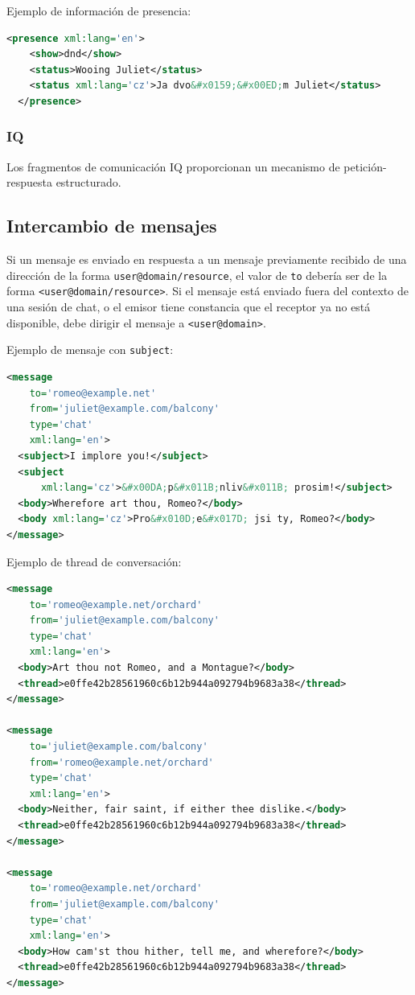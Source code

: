 \documentclass[a4paper, 11pt]{article} %
\begin{document}
      Ejemplo de información de presencia:
  \begin{lstlisting}[language=XML]
  <presence xml:lang='en'>
    <show>dnd</show>
    <status>Wooing Juliet</status>
    <status xml:lang='cz'>Ja dvo&#x0159;&#x00ED;m Juliet</status>
  </presence>
  \end{lstlisting}
  
    \subsubsection{IQ}
      Los fragmentos de comunicación IQ proporcionan un mecanismo de petición-respuesta estructurado.
 
  \subsection{Intercambio de mensajes}
    Si un mensaje es enviado en respuesta a un mensaje previamente recibido de una dirección de la forma 
    \texttt{user@domain/resource}, el valor de \texttt{to} debería ser de la forma \texttt{<user@domain/resource>}. Si el
    mensaje está enviado fuera del contexto de una sesión de chat, o el emisor tiene constancia que el receptor ya no
    está disponible, debe dirigir el mensaje a \texttt{<user@domain>}.
    
    Ejemplo de mensaje con \texttt{subject}:
    \begin{lstlisting}[language=XML]  
<message
    to='romeo@example.net'
    from='juliet@example.com/balcony'
    type='chat'
    xml:lang='en'>
  <subject>I implore you!</subject>
  <subject
      xml:lang='cz'>&#x00DA;p&#x011B;nliv&#x011B; prosim!</subject>
  <body>Wherefore art thou, Romeo?</body>
  <body xml:lang='cz'>Pro&#x010D;e&#x017D; jsi ty, Romeo?</body>
</message> 
    \end{lstlisting}
  
    Ejemplo de thread de conversación:
    \begin{lstlisting}[language=XML]        
<message
    to='romeo@example.net/orchard'
    from='juliet@example.com/balcony'
    type='chat'
    xml:lang='en'>
  <body>Art thou not Romeo, and a Montague?</body>
  <thread>e0ffe42b28561960c6b12b944a092794b9683a38</thread>
</message>

<message
    to='juliet@example.com/balcony'
    from='romeo@example.net/orchard'
    type='chat'
    xml:lang='en'>
  <body>Neither, fair saint, if either thee dislike.</body>
  <thread>e0ffe42b28561960c6b12b944a092794b9683a38</thread>
</message>

<message
    to='romeo@example.net/orchard'
    from='juliet@example.com/balcony'
    type='chat'
    xml:lang='en'>
  <body>How cam'st thou hither, tell me, and wherefore?</body>
  <thread>e0ffe42b28561960c6b12b944a092794b9683a38</thread>
</message>
    \end{lstlisting}
\end{document}
